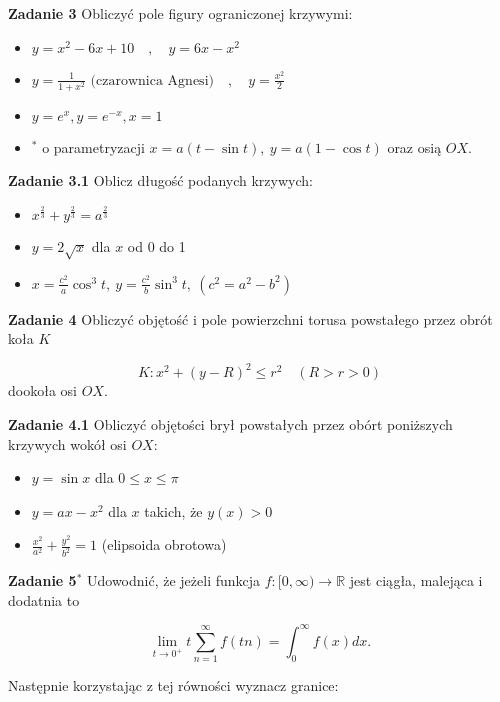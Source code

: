 \documentclass[a4paper,11pt]{article}
\begin{document}
\bigskip

\textbf{Zadanie 3} Obliczyć pole figury ograniczonej krzywymi:
\begin{itemize}
    \item  $y = x^2 - 6x + 10 \quad , \quad y = 6x - x^2$
    \item $y = \frac{1}{1+x^2} \text{~(czarownica Agnesi)} \quad , \quad 
        y = \frac{x^2}{2}$
    \item $y=e^x, y=e^{-x}, x =1$
    \item $^\ast$ o parametryzacji  $x = a(t-\sin t), ~ y = a(1-\cos t)$
        oraz osią $OX$.
\end{itemize}

\bigskip

\textbf{Zadanie 3.1} Oblicz długość podanych krzywych:

\begin{itemize}
    \item $x^{\frac{2}{3}} + y^{\frac{2}{3}} = a^{\frac{2}{3}}$ 
    \item $y = 2 \sqrt{x}$ dla $x$ od 0 do 1
    \item  $x = \frac{c^2}{a} \cos^3 t,~ y = \frac{c^2}{b} \sin^3 t,~ (c^2
        = a^2 - b^2)$
\end{itemize}

\bigskip

\textbf{Zadanie 4} Obliczyć objętość i pole powierzchni torusa powstałego
przez obrót koła $K$ 

\[
K: x^2 + (y-R)^2 \le r^2 \quad (R>r>0)
\]
dookoła osi $OX$.

\bigskip

\textbf{Zadanie 4.1} Obliczyć objętości brył powstałych przez obórt
poniższych krzywych wokół osi $OX$:

 \begin{itemize}
    \item $y = \sin x$ dla $0\le x \le \pi$
    \item $y = ax - x^2$ dla $x$ takich, że $y(x) >0$
    \item $\frac{x^2}{a^2} + \frac{y^2}{b^2} = 1$ (elipsoida obrotowa)
\end{itemize}

\bigskip

\textbf{Zadanie 5}$^\ast$ Udowodnić, że jeżeli funkcja $f : [0,\infty) →
\mathbb{R}$ jest ciągła, malejąca i dodatnia to

\[
\lim_{t\to 0^+} t \sum_{n=1}^\infty f(tn) = \int_{0}^\infty f(x) dx
.\] 

Następnie korzystając z tej równości wyznacz granice:
\end{document}
